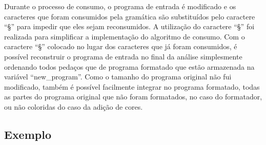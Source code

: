 Durante o processo de consumo,
o programa de entrada é modificado e
os caracteres que foram consumidos pela gramática são substituídos pelo caractere ``§'' para impedir que eles sejam reconsumidos.
A utilização do caractere ``§'' foi realizada para simplificar a implementação do algoritmo de consumo.
Com o caractere ``§'' colocado no lugar dos caracteres que já foram consumidos,
é possível reconstruir o programa de entrada no final da análise simplesmente ordenando todos pedaços que de programa formatado que estão armazenada na variável ``new\_program''.
Como o tamanho do programa original não fui modificado,
também é possível facilmente integrar no programa formatado,
todas as partes do programa original que não foram formatados,
no caso do formatador,
ou não coloridas do caso da adição de cores.


\subsection{Exemplo}

